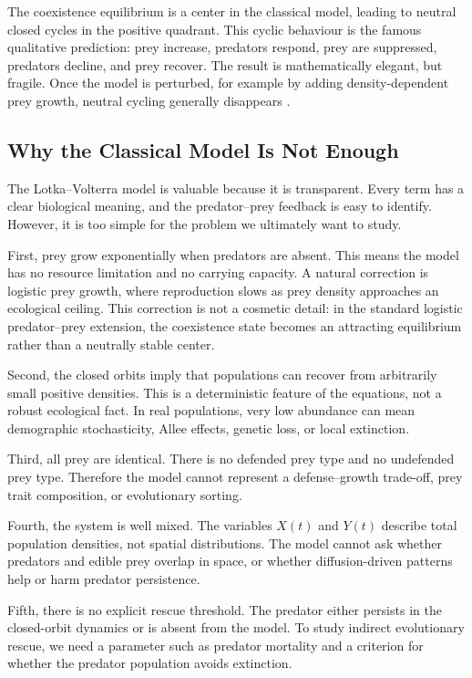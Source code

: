 \documentclass[12pt,letterpaper]{article}
\numberwithin{equation}{section}
\begin{document}
The coexistence equilibrium is a center in the classical model, leading to neutral
closed cycles in the positive quadrant. This cyclic behaviour is the famous qualitative
prediction: prey increase, predators respond, prey are suppressed, predators decline,
and prey recover. The result is mathematically elegant, but fragile. Once the model is
perturbed, for example by adding density-dependent prey growth, neutral cycling
generally disappears \cite{murray2002,kot2001}.

\subsection{Why the Classical Model Is Not Enough}

The Lotka--Volterra model is valuable because it is transparent. Every term has a
clear biological meaning, and the predator--prey feedback is easy to identify.
However, it is too simple for the problem we ultimately want to study.

First, prey grow exponentially when predators are absent. This means the model has no
resource limitation and no carrying capacity. A natural correction is logistic prey
growth, where reproduction slows as prey density approaches an ecological ceiling.
This correction is not a cosmetic detail: in the standard logistic predator--prey
extension, the coexistence state becomes an attracting equilibrium rather than a
neutrally stable center.

Second, the closed orbits imply that populations can recover from arbitrarily small
positive densities. This is a deterministic feature of the equations, not a robust
ecological fact. In real populations, very low abundance can mean demographic
stochasticity, Allee effects, genetic loss, or local extinction.

Third, all prey are identical. There is no defended prey type and no undefended prey
type. Therefore the model cannot represent a defense--growth trade-off, prey trait
composition, or evolutionary sorting.

Fourth, the system is well mixed. The variables $X(t)$ and $Y(t)$ describe total
population densities, not spatial distributions. The model cannot ask whether
predators and edible prey overlap in space, or whether diffusion-driven patterns help
or harm predator persistence.

Fifth, there is no explicit rescue threshold. The predator either persists in the
closed-orbit dynamics or is absent from the model. To study indirect evolutionary
rescue, we need a parameter such as predator mortality and a criterion for whether the
predator population avoids extinction.
\end{document}
